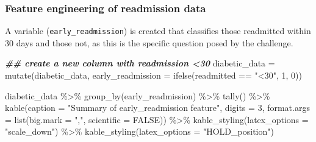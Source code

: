 \documentclass[
]{article}
\newenvironment{Shaded}{\begin{snugshade}}{\end{snugshade}}
\newcommand{\AttributeTok}[1]{\textcolor[rgb]{0.77,0.63,0.00}{#1}}
\newcommand{\ConstantTok}[1]{\textcolor[rgb]{0.00,0.00,0.00}{#1}}
\newcommand{\DecValTok}[1]{\textcolor[rgb]{0.00,0.00,0.81}{#1}}
\newcommand{\DocumentationTok}[1]{\textcolor[rgb]{0.56,0.35,0.01}{\textbf{\textit{#1}}}}
\newcommand{\FunctionTok}[1]{\textcolor[rgb]{0.00,0.00,0.00}{#1}}
\newcommand{\NormalTok}[1]{#1}
\newcommand{\OtherTok}[1]{\textcolor[rgb]{0.56,0.35,0.01}{#1}}
\newcommand{\SpecialCharTok}[1]{\textcolor[rgb]{0.00,0.00,0.00}{#1}}
\newcommand{\StringTok}[1]{\textcolor[rgb]{0.31,0.60,0.02}{#1}}
\begin{document}
\hypertarget{feature-engineering-of-readmission-data}{%
\subsubsection{Feature engineering of readmission
data}\label{feature-engineering-of-readmission-data}}

A variable (\texttt{early\_readmission}) is created that classifies
those readmitted within 30 days and those not, as this is the specific
question posed by the challenge.

\begin{Shaded}
\begin{Highlighting}[]
\DocumentationTok{\#\# create a new column with readmission \textless{}30}
\NormalTok{diabetic\_data }\OtherTok{=} \FunctionTok{mutate}\NormalTok{(diabetic\_data, }\AttributeTok{early\_readmission =} \FunctionTok{ifelse}\NormalTok{(readmitted }\SpecialCharTok{==}
    \StringTok{"\textless{}30"}\NormalTok{, }\DecValTok{1}\NormalTok{, }\DecValTok{0}\NormalTok{))}

\NormalTok{diabetic\_data }\SpecialCharTok{\%\textgreater{}\%}
    \FunctionTok{group\_by}\NormalTok{(early\_readmission) }\SpecialCharTok{\%\textgreater{}\%}
    \FunctionTok{tally}\NormalTok{() }\SpecialCharTok{\%\textgreater{}\%}
    \FunctionTok{kable}\NormalTok{(}\AttributeTok{caption =} \StringTok{"Summary of early\_readmission feature"}\NormalTok{,}
        \AttributeTok{digits =} \DecValTok{3}\NormalTok{, }\AttributeTok{format.args =} \FunctionTok{list}\NormalTok{(}\AttributeTok{big.mark =} \StringTok{","}\NormalTok{,}
            \AttributeTok{scientific =} \ConstantTok{FALSE}\NormalTok{)) }\SpecialCharTok{\%\textgreater{}\%}
    \FunctionTok{kable\_styling}\NormalTok{(}\AttributeTok{latex\_options =} \StringTok{"scale\_down"}\NormalTok{) }\SpecialCharTok{\%\textgreater{}\%}
    \FunctionTok{kable\_styling}\NormalTok{(}\AttributeTok{latex\_options =} \StringTok{"HOLD\_position"}\NormalTok{)}
\end{Highlighting}
\end{Shaded}

\begin{table}[H]

\caption{\label{tab:unnamed-chunk-17}Summary of early_readmission feature}
\centering
{}
\end{table}
\end{document}
